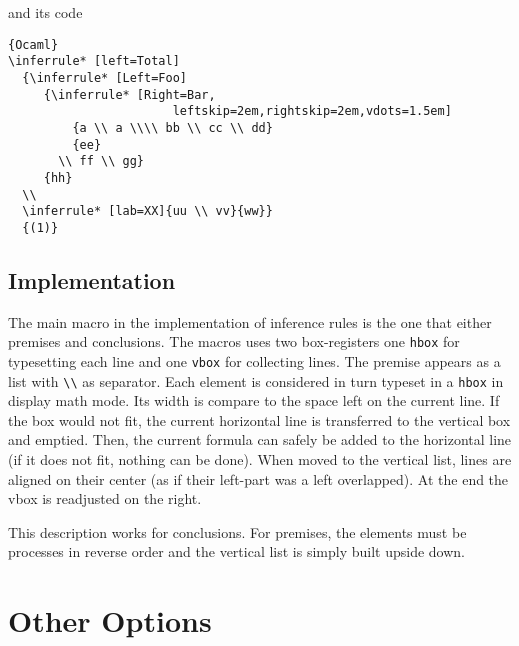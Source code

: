 \documentclass {article}
\begin{document}
and its code
\begin{lstlisting}{Ocaml}
\inferrule* [left=Total]
  {\inferrule* [Left=Foo]
     {\inferrule* [Right=Bar,
                       leftskip=2em,rightskip=2em,vdots=1.5em]
         {a \\ a \\\\ bb \\ cc \\ dd}
         {ee}
       \\ ff \\ gg}
     {hh}
  \\
  \inferrule* [lab=XX]{uu \\ vv}{ww}}
  {(1)}
\end{lstlisting}

\def \L#1{\lower 0.4ex \hbox {#1}}
\def \R#1{\raise 0.4ex \hbox {#1}}
\def \hevea {H\L{E}\R{V}\L{E}A}
\def \hevea {$\mbox {H}\!_{\mbox {E}}\!\mbox {V}\!_{\mbox {E}}\!\mbox {A}$}


\subsection {Implementation}

The main macro in the implementation of inference rules is the one that
either premises and conclusions.  The macros uses two box-registers one
\verb"hbox" for typesetting each line and one \verb"vbox" for collecting
lines. The premise appears as a list with
\verb"\\" as separator. Each element is considered in turn typeset in a
\verb"hbox" in display math mode. Its width is compare to the space left on
the current line. If the box would not fit, the current horizontal line is
transferred to the vertical box and emptied. Then, the current formula can
safely be added to the horizontal line (if it does not fit, nothing can be
done). When moved to the vertical list, lines are aligned on their center
(as if their left-part was a left overlapped). At the end the vbox is
readjusted on the right. 

This description works for conclusions. For premises, the elements must be
processes in reverse order and the vertical list is simply built upside
down. 


\section {Other Options}

\label {options}
\end{document}
